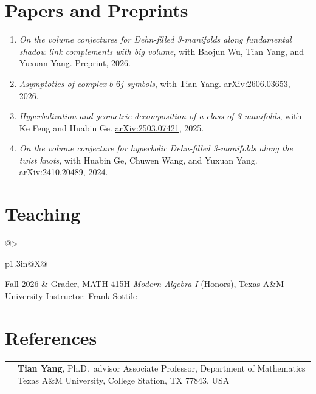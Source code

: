 \documentclass[11pt]{article}
\makeatletter
\newcommand{\cventry}[2]{%
  \begin{tabularx}{\linewidth}{@{}>{\raggedright\arraybackslash}p{1.3in}@{}X@{}}
    \textcolor{muted}{#1} & #2
  \end{tabularx}\par\vspace{0.4em}}
\makeatother
\begin{document}
\section{Papers and Preprints}
\begin{enumerate}[leftmargin=2.4em,labelsep=0.7em,itemsep=0.55em,topsep=0pt,parsep=0pt]
  \item[{[4]}] \textit{On the volume conjectures for Dehn-filled 3-manifolds along fundamental shadow link
    complements with big volume}, with Baojun Wu, Tian Yang, and Yuxuan Yang.\newline
    Preprint, 2026.
  \item[{[3]}] \textit{Asymptotics of complex $b$-$6j$ symbols}, with Tian Yang.\newline
    \href{https://arxiv.org/abs/2606.03653}{arXiv:2606.03653}, 2026.
  \item[{[2]}] \textit{Hyperbolization and geometric decomposition of a class of 3-manifolds},
    with Ke Feng and Huabin Ge.\newline
    \href{https://arxiv.org/abs/2503.07421}{arXiv:2503.07421}, 2025.
  \item[{[1]}] \textit{On the volume conjecture for hyperbolic Dehn-filled 3-manifolds along the twist knots},
    with Huabin Ge, Chuwen Wang, and Yuxuan Yang.\newline
    \href{https://arxiv.org/abs/2410.20489}{arXiv:2410.20489}, 2024.
\end{enumerate}

\section{Teaching}
\cventry{Fall 2026}{Grader, MATH 415H \textit{Modern Algebra I} (Honors), Texas A\&M University\newline
  Instructor: Frank Sottile}

\section{References}
\cventry{}{\textbf{Tian Yang}, Ph.D.\ advisor\newline
  Associate Professor, Department of Mathematics\newline
  Texas A\&M University, College Station, TX 77843, USA}
\end{document}
